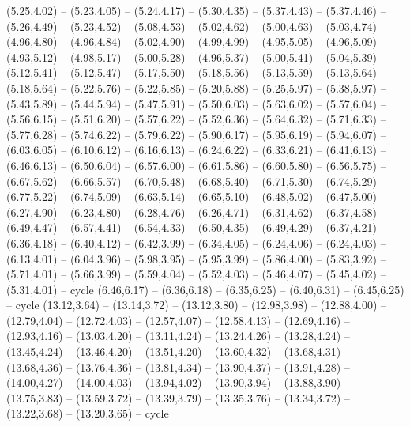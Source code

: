 \expandafter\def\csname geo:gebiet:DEU\endcsname{
  (5.25,4.02) -- (5.23,4.05) -- (5.24,4.17) -- (5.30,4.35) -- (5.37,4.43) -- (5.37,4.46) -- (5.26,4.49) -- (5.23,4.52) -- (5.08,4.53) -- (5.02,4.62) -- (5.00,4.63) -- (5.03,4.74) -- (4.96,4.80) -- (4.96,4.84) -- (5.02,4.90) -- (4.99,4.99) -- (4.95,5.05) -- (4.96,5.09) -- (4.93,5.12) -- (4.98,5.17) -- (5.00,5.28) -- (4.96,5.37) -- (5.00,5.41) -- (5.04,5.39) -- (5.12,5.41) -- (5.12,5.47) -- (5.17,5.50) -- (5.18,5.56) -- (5.13,5.59) -- (5.13,5.64) -- (5.18,5.64) -- (5.22,5.76) -- (5.22,5.85) -- (5.20,5.88) -- (5.25,5.97) -- (5.38,5.97) -- (5.43,5.89) -- (5.44,5.94) -- (5.47,5.91) -- (5.50,6.03) -- (5.63,6.02) -- (5.57,6.04) -- (5.56,6.15) -- (5.51,6.20) -- (5.57,6.22) -- (5.52,6.36) -- (5.64,6.32) -- (5.71,6.33) -- (5.77,6.28) -- (5.74,6.22) -- (5.79,6.22) -- (5.90,6.17) -- (5.95,6.19) -- (5.94,6.07) -- (6.03,6.05) -- (6.10,6.12) -- (6.16,6.13) -- (6.24,6.22) -- (6.33,6.21) -- (6.41,6.13) -- (6.46,6.13) -- (6.50,6.04) -- (6.57,6.00) -- (6.61,5.86) -- (6.60,5.80) -- (6.56,5.75) -- (6.67,5.62) -- (6.66,5.57) -- (6.70,5.48) -- (6.68,5.40) -- (6.71,5.30) -- (6.74,5.29) -- (6.77,5.22) -- (6.74,5.09) -- (6.63,5.14) -- (6.65,5.10) -- (6.48,5.02) -- (6.47,5.00) -- (6.27,4.90) -- (6.23,4.80) -- (6.28,4.76) -- (6.26,4.71) -- (6.31,4.62) -- (6.37,4.58) -- (6.49,4.47) -- (6.57,4.41) -- (6.54,4.33) -- (6.50,4.35) -- (6.49,4.29) -- (6.37,4.21) -- (6.36,4.18) -- (6.40,4.12) -- (6.42,3.99) -- (6.34,4.05) -- (6.24,4.06) -- (6.24,4.03) -- (6.13,4.01) -- (6.04,3.96) -- (5.98,3.95) -- (5.95,3.99) -- (5.86,4.00) -- (5.83,3.92) -- (5.71,4.01) -- (5.66,3.99) -- (5.59,4.04) -- (5.52,4.03) -- (5.46,4.07) -- (5.45,4.02) -- (5.31,4.01) -- cycle
  (6.46,6.17) -- (6.36,6.18) -- (6.35,6.25) -- (6.40,6.31) -- (6.45,6.25) -- cycle}
\expandafter\def\csname geo:gebiet:GEO\endcsname{
  (13.12,3.64) -- (13.14,3.72) -- (13.12,3.80) -- (12.98,3.98) -- (12.88,4.00) -- (12.79,4.04) -- (12.72,4.03) -- (12.57,4.07) -- (12.58,4.13) -- (12.69,4.16) -- (12.93,4.16) -- (13.03,4.20) -- (13.11,4.24) -- (13.24,4.26) -- (13.28,4.24) -- (13.45,4.24) -- (13.46,4.20) -- (13.51,4.20) -- (13.60,4.32) -- (13.68,4.31) -- (13.68,4.36) -- (13.76,4.36) -- (13.81,4.34) -- (13.90,4.37) -- (13.91,4.28) -- (14.00,4.27) -- (14.00,4.03) -- (13.94,4.02) -- (13.90,3.94) -- (13.88,3.90) -- (13.75,3.83) -- (13.59,3.72) -- (13.39,3.79) -- (13.35,3.76) -- (13.34,3.72) -- (13.22,3.68) -- (13.20,3.65) -- cycle}
